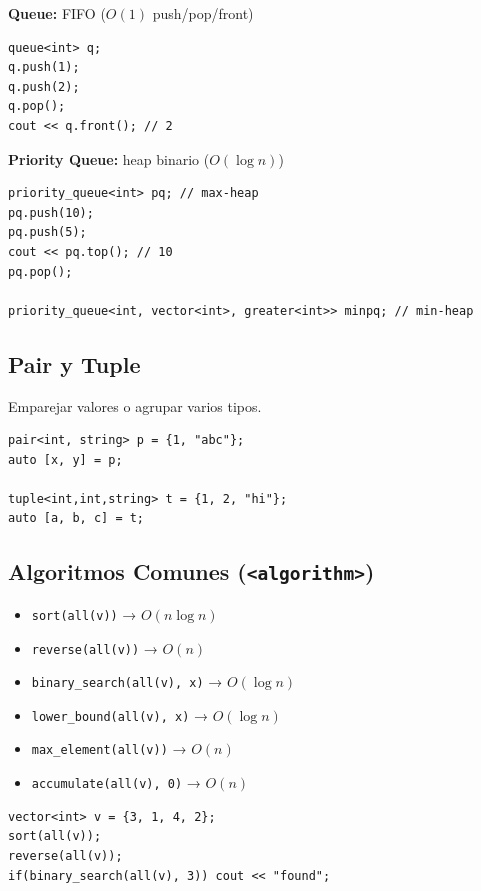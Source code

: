 \documentclass{article}
\begin{document}
\textbf{Queue:} FIFO (\(O(1)\) push/pop/front)

\begin{lstlisting}[style=cppstyle]
queue<int> q;
q.push(1);
q.push(2);
q.pop();
cout << q.front(); // 2
\end{lstlisting}

\textbf{Priority Queue:} heap binario (\(O(\log n)\))

\begin{lstlisting}[style=cppstyle]
priority_queue<int> pq; // max-heap
pq.push(10);
pq.push(5);
cout << pq.top(); // 10
pq.pop();

priority_queue<int, vector<int>, greater<int>> minpq; // min-heap
\end{lstlisting}


\subsection{Pair y Tuple}

Emparejar valores o agrupar varios tipos.

\begin{lstlisting}[style=cppstyle]
pair<int, string> p = {1, "abc"};
auto [x, y] = p;

tuple<int,int,string> t = {1, 2, "hi"};
auto [a, b, c] = t;
\end{lstlisting}


\subsection{Algoritmos Comunes (\texttt{<algorithm>})}

\begin{itemize}
  \item \lstinline|sort(all(v))| → \(O(n \log n)\)
  \item \lstinline|reverse(all(v))| → \(O(n)\)
  \item \lstinline|binary_search(all(v), x)| → \(O(\log n)\)
  \item \lstinline|lower_bound(all(v), x)| → \(O(\log n)\)
  \item \lstinline|max_element(all(v))| → \(O(n)\)
  \item \lstinline|accumulate(all(v), 0)| → \(O(n)\)
\end{itemize}

\begin{lstlisting}[style=cppstyle]
vector<int> v = {3, 1, 4, 2};
sort(all(v));
reverse(all(v));
if(binary_search(all(v), 3)) cout << "found";
\end{lstlisting}
\end{document}
